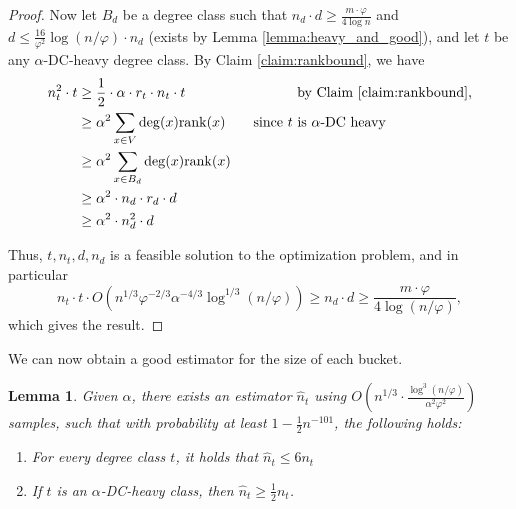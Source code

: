 \documentclass[letterpaper,11pt]{article}
\newcommand{\rank}{\mathrm{rank}}
\theoremstyle{plain}
\newtheorem{lemma}[theorem]{Lemma}
\theoremstyle{definition}
\theoremstyle{remark}
\begin{document}
\begin{proof}
Now let $B_d$ be a degree class such that $n_d \cdot d \geq \frac{m\cdot \varphi}{4\log n}$ and  $d \leq \frac{16}{\varphi^2} \log(n/\varphi) \cdot  n_d$ (exists by Lemma \ref{lemma:heavy_and_good}), and let $t$ be any $\alpha$-DC-heavy degree class. 
By Claim \ref{claim:rankbound}, we have 
\begin{align*}
    n_t^2 \cdot t &\geq \frac{1}{2} \cdot \alpha \cdot r_t \cdot n_t \cdot t \qquad \qquad \qquad \qquad \text{by Claim \ref{claim:rankbound},} \\
    & \geq \alpha^2 \sum_{x \in V} \deg(x) \rank(x) \qquad \text{since $t$ is $\alpha$-DC heavy} \\
    &  \geq  \alpha^2 \sum_{x \in B_d} \deg(x) \rank(x) \\
    & \geq \alpha^2 \cdot n_d \cdot r_d \cdot d \\
    & \geq \alpha^2 \cdot n_d^2 \cdot d
\end{align*}

Thus, $t, n_t, d, n_d $ is a feasible solution to the optimization problem, and in particular 
 \[n_t \cdot t \cdot O(n^{1/3} \varphi^{-2/3}\alpha^{-4/3} \log^{1/3}(n/\varphi))\geq n_d \cdot d \geq \frac{m \cdot \varphi}{4 \log (n/\varphi)}, \] which gives the result. 
\end{proof}
We can now obtain a good estimator for the size of each bucket. 
\begin{lemma}\label{lemma:nhat}
 Given $\alpha$, there exists an estimator $\hat{n}_t$ using $O\left(n^{1/3} \cdot \frac{\log^3 (n/\varphi)}{\alpha^2 \varphi^2}\right)$ samples, such that with probability at least $1-\frac{1}{2}n^{-101}$, the following holds: 
\begin{enumerate}
    \item For every degree class $t$, it holds that $\hat{n}_t \leq 6n_t$
    \item If $t$ is an $\alpha$-DC-heavy class, then $\hat{n}_t \geq  \frac{1}{2}n_t$. 
 \end{enumerate}
\end{lemma}
\end{document}
